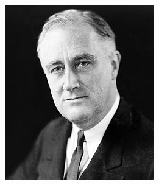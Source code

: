 \begin{frame}
\begin{columns}[c]
\includegraphics[width= \textwidth]{1-3_data_collection_principles/figures/landon_fdr/fdr}

\end{columns}

\end{frame}


